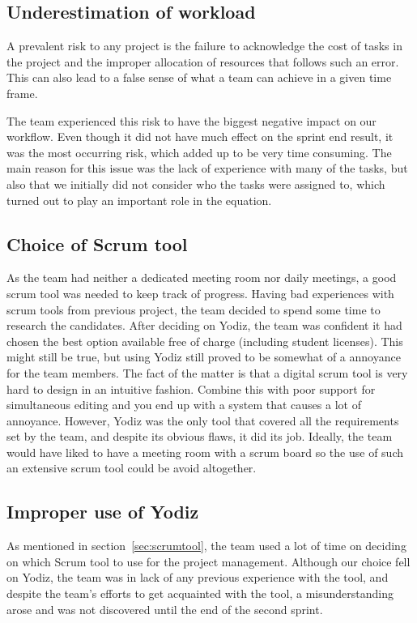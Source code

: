 \subsection{Underestimation of workload}
A prevalent risk to any project is the failure to acknowledge the cost of tasks in the project and the improper allocation of resources that follows such an error. This can also lead to a false sense of what a team can achieve in a given time frame. 

The team experienced this risk to have the biggest negative impact on our workflow. Even though it did not have much effect on the sprint end result, it was the most occurring risk, which added up to be very time consuming. The main reason for this issue was the lack of experience with many of the tasks, but also that we initially did not consider who the tasks were assigned to, which turned out to play an important role in the equation. 


\subsection{Choice of Scrum tool}
As the team had neither a dedicated meeting room nor daily meetings, a good scrum tool was needed to keep track of progress. Having bad experiences with scrum tools from previous project, the team decided to spend some time to research the candidates. After deciding on Yodiz, the team was confident it had chosen the best option available free of charge (including student licenses). This might still be true, but using Yodiz still proved to be somewhat of a annoyance for the team members. The fact of the matter is that a digital scrum tool is very hard to design in an intuitive fashion. Combine this with poor support for simultaneous editing and you end up with a system that causes a lot of annoyance. However, Yodiz was the only tool that covered all the requirements set by the team, and despite its obvious flaws, it did its job. Ideally, the team would have liked to have a meeting room with a scrum board so the use of such an extensive scrum tool could be avoid altogether.

\subsection{Improper use of Yodiz}
\label{sec:improperScrum}
As mentioned in section~\ref{sec:scrumtool}, the team used a lot of time on
deciding on which Scrum tool to use for the project management. Although our
choice fell on Yodiz, the team was in lack of any previous experience with the
tool, and despite the team's efforts to get acquainted with the tool, a
misunderstanding arose and was not discovered until the end of the second
sprint.

